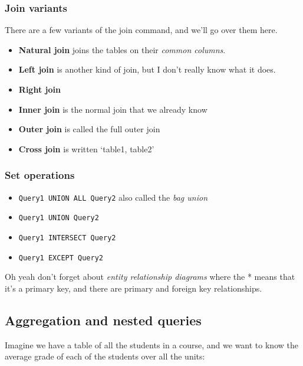 \documentclass[11pt,a4paper,titlepage,dvipsnames,cmyk]{scrartcl}
\begin{document}
\begin{minipage}{\textwidth}
\subsubsection{Join variants}%
\label{ssub:variants-join}

There are a few variants of the join command, and we'll go over them here.

\begin{itemize}
    \item \textbf{Natural join} joins the tables on their \textit{common
        columns}.
    \item \textbf{Left join} is another kind of join, but I don't really
        know what it does.
    \item \textbf{Right join}
    \item \textbf{Inner join} is the normal join that we already know
    \item \textbf{Outer join} is called the full outer join
    \item \textbf{Cross join} is written `table1, table2'
\end{itemize}
\end{minipage}

\subsubsection{Set operations}%
\label{ssub:set-operations}
\begin{itemize}
    \item \lstinline|Query1 UNION ALL Query2| also called the \textit{bag
        union} 
    \item \lstinline|Query1 UNION Query2| 
    \item \lstinline|Query1 INTERSECT Query2| 
    \item \lstinline|Query1 EXCEPT Query2| 
\end{itemize}

Oh yeah don't forget about \textit{entity relationship diagrams} where the
* means that it's a primary key, and there are primary and foreign key
relationships.

\subsection{Aggregation and nested queries}%
\label{sub:aggregation}

Imagine we have a table of all the students in a course, and we want to
know the average grade of each of the students over all the units:
\end{document}
